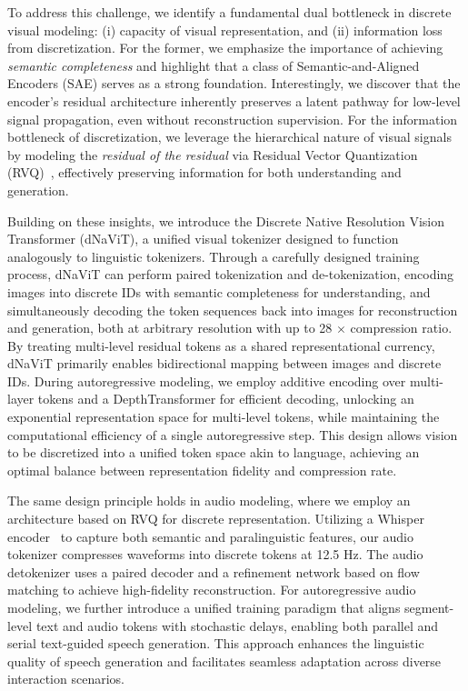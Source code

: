 \documentclass{article}
\begin{document}
To address this challenge, we identify a fundamental dual bottleneck in discrete visual modeling: (i) capacity of visual representation, and (ii) information loss from discretization. For the former, we emphasize the importance of achieving \textit{semantic completeness} and highlight that a class of Semantic-and-Aligned Encoders (SAE) serves as a strong foundation. Interestingly, we discover that the encoder's residual architecture inherently preserves a latent pathway for low-level signal propagation, even without reconstruction supervision. 
For the information bottleneck of discretization, we leverage the hierarchical nature of visual signals by modeling the \textit{residual of the residual} via Residual Vector Quantization (RVQ)~\cite{rqvae}, effectively preserving information for both understanding and generation.


Building on these insights, we introduce the Discrete Native Resolution Vision Transformer (dNaViT), a unified visual tokenizer designed to function analogously to linguistic tokenizers.
Through a carefully designed training process, dNaViT can perform paired tokenization and de-tokenization, encoding images into discrete IDs with semantic completeness for understanding, and simultaneously decoding the token sequences back into images for reconstruction and generation, both at arbitrary resolution with up to 28 $\times$ compression ratio.
By treating multi-level residual tokens as a shared representational currency, dNaViT primarily enables bidirectional mapping between images and discrete IDs.
During autoregressive modeling, we employ additive encoding over multi-layer tokens and a DepthTransformer for efficient decoding, unlocking an exponential representation space for multi-level tokens, while maintaining the computational efficiency of a single autoregressive step. This design allows vision to be discretized into a unified token space akin to language, achieving an optimal balance between representation fidelity and compression rate.


The same design principle holds in audio modeling, where we employ an architecture based on RVQ for discrete representation. Utilizing a Whisper encoder~\cite{radford2023robust} to capture both semantic and paralinguistic features, our audio tokenizer compresses waveforms into discrete tokens at 12.5 Hz. The audio detokenizer uses a paired decoder and a refinement network based on flow matching to achieve high-fidelity reconstruction. For autoregressive audio modeling, we further introduce a unified training paradigm that aligns segment-level text and audio tokens with stochastic delays, enabling both parallel and serial text-guided speech generation. This approach enhances the linguistic quality of speech generation and facilitates seamless adaptation across diverse interaction scenarios.
\end{document}
